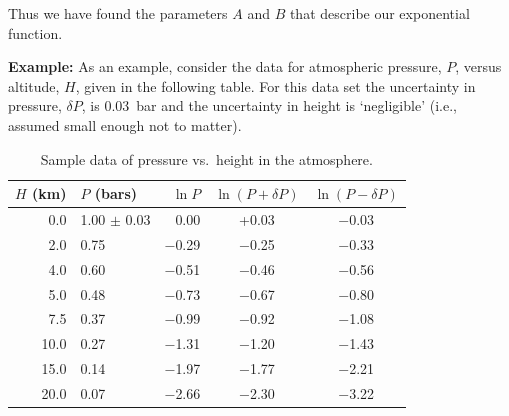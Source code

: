 Thus we have found the parameters $A$ and $B$ that describe our
exponential function.


{\bf Example: }
As an example, consider the data for atmospheric pressure, $P$,
versus altitude, $H$, given in the following table.
For this data set the uncertainty in pressure, $\delta P$, is 0.03~bar
and the uncertainty in height is `negligible' (i.e., assumed small enough
not to matter).

\begin{table}[h]
\begin{center}
\begin{tabular}{|rlrcc|}
\hline
$H$ (km) & $P$ (bars) & $\ln P$ & $\ln (P + \delta P)$ & $\ln (P - \delta P)$ \\
 \hline
0.0 \hspace{6pt}  & 1.00 $\pm$ 0.03 & 0.00    & +0.03     &  $-$0.03\\
2.0 \hspace{6pt}  & 0.75            & $-$0.29 & $-$0.25   &  $-$0.33 \\
4.0 \hspace{6pt}  &     0.60        & $-$0.51 &   $-$0.46 &  $-$0.56 \\
5.0 \hspace{6pt}  &     0.48        & $-$0.73 &   $-$0.67 &  $-$0.80 \\
7.5 \hspace{6pt}  &   0.37          & $-$0.99 &   $-$0.92 &  $-$1.08  \\
10.0 \hspace{6pt} &   0.27          & $-$1.31 &   $-$1.20 &  $-$1.43 \\
15.0 \hspace{6pt} &     0.14        & $-$1.97 &   $-$1.77 &  $-$2.21 \\
20.0 \hspace{6pt} &     0.07        & $-$2.66 &   $-$2.30 &  $-$3.22 \\
\hline
\end{tabular}
\end{center}
\caption{Sample data of pressure vs.\ height in the atmosphere.
     \label{table:pressure}}
\end{table}

